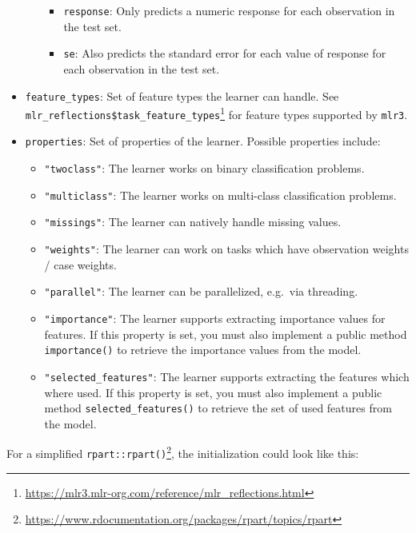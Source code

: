 \documentclass[12pt,]{scrbook}
\providecommand{\tightlist}{%
  \setlength{\itemsep}{0pt}\setlength{\parskip}{0pt}}
\renewcommand{\href}[2]{#2\footnote{\url{#1}}}
\begin{document}
\begin{itemize}
\begin{itemize}
    \begin{itemize}
    \tightlist
    \item
      \texttt{response}: Only predicts a numeric response for each observation in the test set.
    \item
      \texttt{se}: Also predicts the standard error for each value of response for each observation in the test set.
    \end{itemize}
  \end{itemize}
\item
  \texttt{feature\_types}: Set of feature types the learner can handle.
  See \href{https://mlr3.mlr-org.com/reference/mlr_reflections.html}{\texttt{mlr\_reflections\$task\_feature\_types}} for feature types supported by \texttt{mlr3}.
\item
  \texttt{properties}: Set of properties of the learner. Possible properties include:

  \begin{itemize}
  \tightlist
  \item
    \texttt{"twoclass"}: The learner works on binary classification problems.
  \item
    \texttt{"multiclass"}: The learner works on multi-class classification problems.
  \item
    \texttt{"missings"}: The learner can natively handle missing values.
  \item
    \texttt{"weights"}: The learner can work on tasks which have observation weights / case weights.
  \item
    \texttt{"parallel"}: The learner can be parallelized, e.g.~via threading.
  \item
    \texttt{"importance"}: The learner supports extracting importance values for features.
    If this property is set, you must also implement a public method \texttt{importance()} to retrieve the importance values from the model.
  \item
    \texttt{"selected\_features"}: The learner supports extracting the features which where used.
    If this property is set, you must also implement a public method \texttt{selected\_features()} to retrieve the set of used features from the model.
  \end{itemize}
\end{itemize}

For a simplified \href{https://www.rdocumentation.org/packages/rpart/topics/rpart}{\texttt{rpart::rpart()}}, the initialization could look like this:
\end{document}

